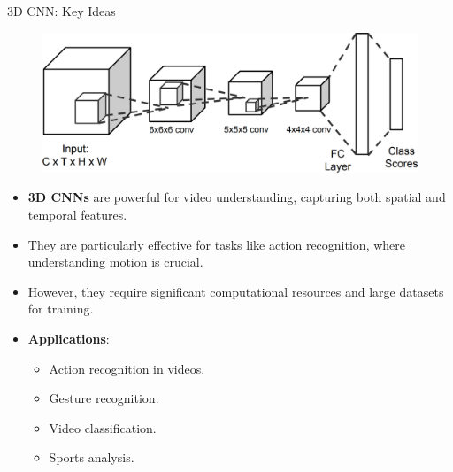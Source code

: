 \begin{frame}[allowframebreaks]{3D CNN: Key Ideas}
\begin{figure}
    \end{figure}
\framebreak
    \begin{figure}
        \centering
        \includegraphics[width=1\textwidth,height=0.9\textheight,keepaspectratio]{images/video/slide_17_1_img.png}
    \end{figure}
\framebreak
    \begin{itemize}
        \item \textbf{3D CNNs} are powerful for video understanding, capturing both spatial and temporal features.
        \item They are particularly effective for tasks like action recognition, where understanding motion is crucial.
        \item However, they require significant computational resources and large datasets for training.
        \item \textbf{Applications}:
        \begin{itemize}
            \item Action recognition in videos.
            \item Gesture recognition.
            \item Video classification.
            \item Sports analysis.
        \end{itemize}
    \end{itemize}
\end{frame}